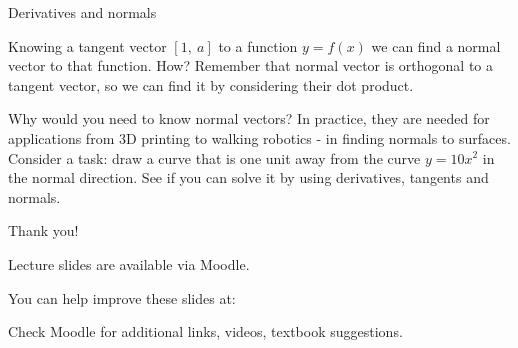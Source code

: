 \documentclass{beamer}
\begin{document}
\begin{frame}{Derivatives and normals}
	\begin{flushleft}
		
		Knowing a tangent vector $[1, \ a]$ to a function $y = f(x)$ we can find a normal vector to that function. How? Remember that normal vector is orthogonal to a tangent vector, so we can find it by considering their dot product.
		
		\bigskip
		
		Why would you need to know normal vectors? In practice, they are needed for applications from 3D printing to walking robotics - in finding normals to surfaces. Consider a task: draw a curve that is one unit away from the curve $y = 10 x^2$ in the normal direction. See if you can solve it by using derivatives, tangents and normals.
		
		
		
	\end{flushleft}
\end{frame}



\begin{frame}{Thank you!}
\centerline{Lecture slides are available via Moodle.}
\bigskip
\centerline{You can help improve these slides at:}
\centerline{\mygit}
\bigskip
\centerline{Check Moodle for additional links, videos, textbook suggestions.}
\bigskip

\centerline{\textcolor{black}{}}

\end{frame}
\end{document}
